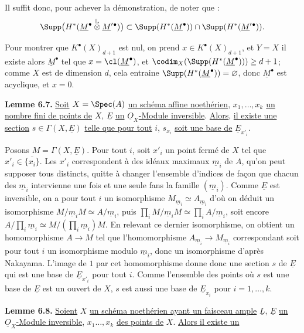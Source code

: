 
Il suffit donc, pour achever la démonstration, de noter que :
\[
\Supp\bigl(H^*(\underline{M}^\bullet\overset{\mathbb L}{\otimes}\underline{M}'{}^\bullet)\bigr)
 \subset \Supp(H^*(\underline{M}^\bullet))\cap\Supp(H^*(\underline{M}'{}^\bullet)).
\]

Pour montrer que $K^{\bullet}(X)_{d+1}$ est nul, on prend $x\in K^{\bullet}(X)_{d+1}$, et $Y=X$ il existe alors $\underline{M}^\bullet$ tel que $x=\cl(\underline{M}^\bullet)$, et $\codim_X(\Supp(H^*(\underline{M}^\bullet)))\ge d+1$; comme $X$ est de dimension $d$, cela entraine $\Supp(H^*(\underline{M}^\bullet))=\varnothing$, donc $\underline{M}^\bullet$ est acyclique, et $x=0$.

\textbf{Lemme 6.7.} \uline{Soit} $X=\Spec(A)$ \uline{un schéma affine noethérien}, $x_1,\ldots,x_k$ \uline{un nombre fini de points de} $X$, $\underline{E}$ \uline{un} $\underline{O}_X$\uline{-Module inversible}. \uline{Alors}, \uline{il existe une section} $s\in\Gamma(X,\underline{E})$ \uline{telle que pour tout} $i$, $s_{x_i}$ \uline{soit une base de} $\underline{E}_{x'_i}$.

Posons $M=\Gamma(X,\underline{E})$. Pour tout $i$, soit $x'_i$ un point fermé de $X$ tel que $x'_i\in\overline{\{x_i\}}$. Les $x'_i$ correspondent à des idéaux maximaux $\underline{m}_i$ de $A$, qu'on peut supposer tous distincts, quitte à changer l'ensemble d'indices de façon que chacun des $\underline{m}_i$ intervienne une fois et une seule fans la famille $(\underline{m}_i)$. Comme $\underline{E}$ est inversible, on a pour tout $i$ un isomorphisme $M_{\underline{m}_i}\simeq A_{\underline{m}_i}$ d'où on déduit un isomorphisme $M/\underline{m}_iM\simeq A/\underline{m}_i$, puis $\prod_i M/\underline{m}_iM\simeq\prod_i A/\underline{m}_i$, soit encore $A/\prod_i\underline{m}_i\simeq M/(\prod_i\underline{m}_i)M$. En relevant ce dernier isomorphisme, on obtient un homomorphisme $A\to M$ tel que l'homomorphisme $A_{\underline{m}_i}\to M_{\underline{m}_i}$ correspondant soit pour tout $i$ un isomorphisme modulo $\underline{m}_i$, donc un isomorphisme d'après Nakayama. L'image de $1$ par cet homomorphisme donne donc une section $s$ de $\underline{E}$ qui est une base de $\underline{E}_{x'_i}$ pour tout $i$. Comme l'ensemble des points où $s$ est une base de $\underline{E}$ est un ouvert de $X$, $s$ est aussi une base de $\underline{E}_{x_i}$ pour $i=1,\ldots,k$.

\textbf{Lemme 6.8.} \uline{Soient} $X$ \uline{un schéma noethérien ayant un faisceau ample} $\underline{L}$, $\underline{E}$ \uline{un} $\underline{O}_X$\uline{-Module inversible}, $x_1\ldots,x_k$ \uline{des points de} $X$. \uline{Alors il existe un}
